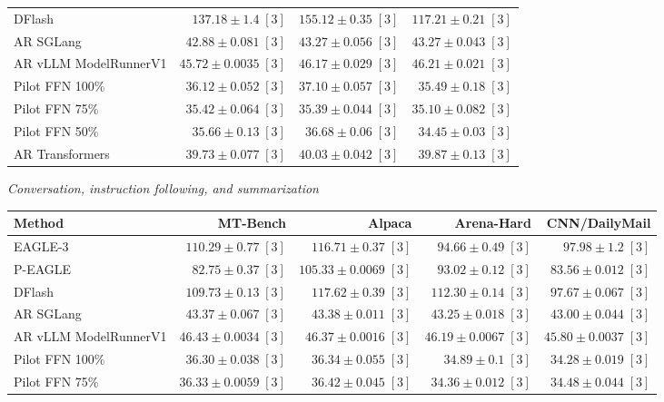 \begin{table}[!tp]
\begin{tabular}{@{}>{\raggedright\arraybackslash}p{3.7cm}rrr@{}}
DFlash & \(\mathbf{137.18} \pm 1.4\;[3]\) & \(\mathbf{155.12} \pm 0.35\;[3]\) & \(\mathbf{117.21} \pm 0.21\;[3]\) \\
AR \textperiodcentered{} SGLang & \(42.88 \pm 0.081\;[3]\) & \(43.27 \pm 0.056\;[3]\) & \(43.27 \pm 0.043\;[3]\) \\
AR \textperiodcentered{} vLLM ModelRunnerV1 & \(45.72 \pm 0.0035\;[3]\) & \(46.17 \pm 0.029\;[3]\) & \(46.21 \pm 0.021\;[3]\) \\
Pilot FFN 100\% & \(36.12 \pm 0.052\;[3]\) & \(37.10 \pm 0.057\;[3]\) & \(35.49 \pm 0.18\;[3]\) \\
Pilot FFN 75\% & \(35.42 \pm 0.064\;[3]\) & \(35.39 \pm 0.044\;[3]\) & \(35.10 \pm 0.082\;[3]\) \\
Pilot FFN 50\% & \(35.66 \pm 0.13\;[3]\) & \(36.68 \pm 0.06\;[3]\) & \(34.45 \pm 0.03\;[3]\) \\
AR \textperiodcentered{} Transformers & \(39.73 \pm 0.077\;[3]\) & \(40.03 \pm 0.042\;[3]\) & \(39.87 \pm 0.13\;[3]\) \\
\bottomrule
\end{tabular}
\par\medskip
\textit{Conversation, instruction following, and summarization}\par\smallskip
\begin{tabular}{@{}>{\raggedright\arraybackslash}p{3.7cm}rrrr@{}}
\toprule
Method & MT-Bench & Alpaca & Arena-Hard & CNN/DailyMail \\
\midrule
EAGLE-3 & \(\mathbf{110.29} \pm 0.77\;[3]\) & \(116.71 \pm 0.37\;[3]\) & \(94.66 \pm 0.49\;[3]\) & \(\mathbf{97.98} \pm 1.2\;[3]\) \\
P-EAGLE & \(82.75 \pm 0.37\;[3]\) & \(105.33 \pm 0.0069\;[3]\) & \(93.02 \pm 0.12\;[3]\) & \(83.56 \pm 0.012\;[3]\) \\
DFlash & \(109.73 \pm 0.13\;[3]\) & \(\mathbf{117.62} \pm 0.39\;[3]\) & \(\mathbf{112.30} \pm 0.14\;[3]\) & \(97.67 \pm 0.067\;[3]\) \\
AR \textperiodcentered{} SGLang & \(43.37 \pm 0.067\;[3]\) & \(43.38 \pm 0.011\;[3]\) & \(43.25 \pm 0.018\;[3]\) & \(43.00 \pm 0.044\;[3]\) \\
AR \textperiodcentered{} vLLM ModelRunnerV1 & \(46.43 \pm 0.0034\;[3]\) & \(46.37 \pm 0.0016\;[3]\) & \(46.19 \pm 0.0067\;[3]\) & \(45.80 \pm 0.0037\;[3]\) \\
Pilot FFN 100\% & \(36.30 \pm 0.038\;[3]\) & \(36.34 \pm 0.055\;[3]\) & \(34.89 \pm 0.1\;[3]\) & \(34.28 \pm 0.019\;[3]\) \\
Pilot FFN 75\% & \(36.33 \pm 0.0059\;[3]\) & \(36.42 \pm 0.045\;[3]\) & \(34.36 \pm 0.012\;[3]\) & \(34.48 \pm 0.044\;[3]\) \\

\end{tabular}
\end{table}
